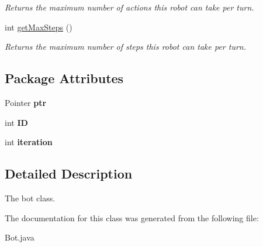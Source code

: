 \begin{DoxyCompactItemize}
\begin{DoxyCompactList}\small\item\em Returns the maximum number of actions this robot can take per turn. \item\end{DoxyCompactList}\item 
\hypertarget{classBot_aa3e61d73d90ec47b879cd08a3efdf475}{
int \hyperlink{classBot_aa3e61d73d90ec47b879cd08a3efdf475}{getMaxSteps} ()}
\label{classBot_aa3e61d73d90ec47b879cd08a3efdf475}

\begin{DoxyCompactList}\small\item\em Returns the maximum number of steps this robot can take per turn. \item\end{DoxyCompactList}\end{DoxyCompactItemize}
\subsection*{Package Attributes}
\begin{DoxyCompactItemize}
\item 
\hypertarget{classBot_a68b1370c5ecf53f9187780a3dccccc77}{
Pointer {\bfseries ptr}}
\label{classBot_a68b1370c5ecf53f9187780a3dccccc77}

\item 
\hypertarget{classBot_a7d665acd119cd73f9c9ddca6101b117b}{
int {\bfseries ID}}
\label{classBot_a7d665acd119cd73f9c9ddca6101b117b}

\item 
\hypertarget{classBot_a0fc227ce34de1e791bb5331faef6442f}{
int {\bfseries iteration}}
\label{classBot_a0fc227ce34de1e791bb5331faef6442f}

\end{DoxyCompactItemize}


\subsection{Detailed Description}
The bot class. 

The documentation for this class was generated from the following file:\begin{DoxyCompactItemize}
\item 
Bot.java\end{DoxyCompactItemize}
